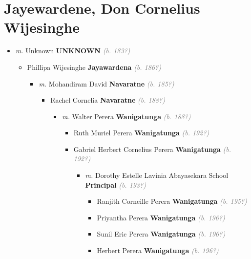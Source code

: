 \documentclass[10pt, openany]{book}
\begin{document}
\chapter{Jayewardene, Don Cornelius Wijesinghe}
\label{00002609}
\textcolor{slmaroon}{\textit{}}
\begin{itemize}
\item{\textit{m.} Unknown \textbf{UNKNOWN} \textcolor{gray}{\textit{(b. 183?)}}   \label{couple:00002609:00003207} \begin{itemize}
\item{Phillipa Wijesinghe \textbf{Jayawardena} \textcolor{gray}{\textit{(b. 186?)}}
\begin{itemize}
\item{\textit{m.} Mohandiram David \textbf{Navaratne} \textcolor{gray}{\textit{(b. 185?)}}   \label{couple:00003245:00003246} \begin{itemize}
\item{Rachel Cornelia  \textbf{Navaratne} \textcolor{gray}{\textit{(b. 188?)}}
\begin{itemize}
\item{\textit{m.} Walter Perera \textbf{Wanigatunga} \textcolor{gray}{\textit{(b. 188?)}}   \label{couple:00003247:00003248} \begin{itemize}
\item{Ruth Muriel Perera  \textbf{Wanigatunga} \textcolor{gray}{\textit{(b. 192?)}}
   }
\item{Gabriel Herbert Cornelius Perera  \textbf{Wanigatunga} \textcolor{gray}{\textit{(b. 192?)}}
\begin{itemize}
\item{\textit{m.} Dorothy Estelle Lavinia Abayasekara School \textbf{Principal} \textcolor{gray}{\textit{(b. 193?)}}   \label{couple:00003251:00003252} \begin{itemize}
\item{Ranjith Corneille Perera  \textbf{Wanigatunga} \textcolor{gray}{\textit{(b. 195?)}}
   }
\item{Priyantha Perera  \textbf{Wanigatunga} \textcolor{gray}{\textit{(b. 196?)}}
  }
\item{Sunil Eric Perera  \textbf{Wanigatunga} \textcolor{gray}{\textit{(b. 196?)}}
   }
\item{Herbert Perera  \textbf{Wanigatunga} \textcolor{gray}{\textit{(b. 196?)}}
}
\end{itemize}}
\end{itemize}}
\end{itemize}}
\end{itemize}}
\end{itemize}}
\end{itemize}}
\end{itemize}}
\end{itemize}
\end{document}
